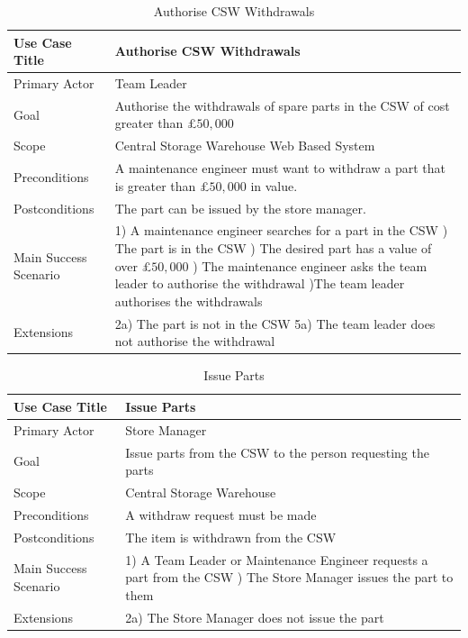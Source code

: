 \begin{table}[]
	\centering
	\caption{Authorise CSW Withdrawals}
	\label{Authorise-CSW-Withdrawals}
	\begin{tabularx}{\textwidth}{| l | X |}
		\hline
	Use Case Title	&  Authorise CSW Withdrawals\\ \hline \hline
	Primary Actor	&  Team Leader\\ \hline
	Goal	&  Authorise the withdrawals of spare parts in the CSW of cost greater than \pounds$50,000$\\ \hline
	Scope	&  Central Storage Warehouse Web Based System\\ \hline
	Preconditions	&  A maintenance engineer must want to withdraw a part that is greater than \pounds$50,000$ in value.\\ \hline
	Postconditions	&  The part can be issued by the store manager.\\ \hline
	Main Success Scenario	&  
		1) A maintenance engineer searches for a part in the CSW \newline
		2) The part is in the CSW \newline
		3) The desired part has a value of over \pounds$50,000$ \newline
		4) The maintenance engineer asks the team leader to authorise the withdrawal \newline
		5)The team leader authorises the withdrawals
	\\ \hline
	Extensions	&  2a) The part is not in the CSW \newline
	5a) The team leader does not authorise the withdrawal \\ \hline
	\end{tabularx}
\end{table}

\begin{table}[]
	\centering
	\caption{Issue Parts}
	\label{Issue Parts}
	\begin{tabularx}{\textwidth}{| l | X |}
		\hline
		Use Case Title	&  Issue Parts \\ \hline \hline
		Primary Actor	&  Store Manager \\ \hline
		Goal	&  Issue parts from the CSW to the person requesting the parts\\ \hline
		Scope	&  Central Storage Warehouse\\ \hline
		Preconditions	&  A withdraw request must be made\\ \hline
		Postconditions	&  The item is withdrawn from the CSW \\ \hline
		Main Success Scenario	&  
			1) A Team Leader or Maintenance Engineer requests a part from the CSW \newline
			2) The Store Manager issues the part to them
		\\ \hline
		Extensions	& 2a) The Store Manager does not issue the part \\ \hline
	\end{tabularx}
\end{table}

